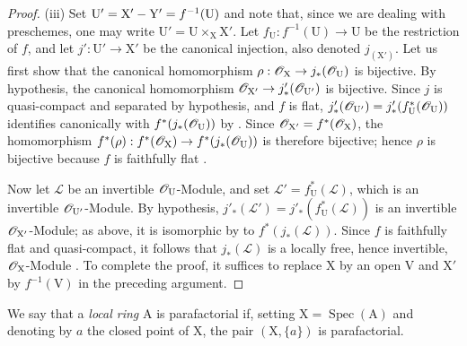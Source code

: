 \begin{proof}
(iii) Set $\mathrm{U}'=\mathrm{X}'-\mathrm{Y}'=f^{-1}(\mathrm{U})$ and note that, since we are dealing with preschemes, one may write $\mathrm{U}'=\mathrm{U}\times_{\mathrm{X}}\mathrm{X}'$. Let $f_{\mathrm{U}}:f^{-1}(\mathrm{U})\to\mathrm{U}$ be the restriction of $f$, and let $j':\mathrm{U}'\to\mathrm{X}'$ be the canonical injection, also denoted $j_{(\mathrm{X}')}$.
Let us first show that the canonical homomorphism $\rho:\mathscr{O}_{\mathrm{X}}\to j_*(\mathscr{O}_{\mathrm{U}})$ is bijective. By hypothesis, the canonical homomorphism $\mathscr{O}_{\mathrm{X}'}\to j'_*(\mathscr{O}_{\mathrm{U}'})$ is bijective. Since $j$ is quasi-compact and separated by hypothesis, and $f$ is flat, $j'_*(\mathscr{O}_{\mathrm{U}'})=j'_*(f_{\mathrm{U}}^*(\mathscr{O}_{\mathrm{U}}))$ identifies canonically with $f^*(j_*(\mathscr{O}_{\mathrm{U}}))$ by . Since $\mathscr{O}_{\mathrm{X}'}=f^*(\mathscr{O}_{\mathrm{X}})$, the homomorphism $f^*(\rho):f^*(\mathscr{O}_{\mathrm{X}})\to f^*(j_*(\mathscr{O}_{\mathrm{U}}))$ is therefore bijective; hence $\rho$ is bijective because $f$ is faithfully flat .

Now let $\mathscr{L}$ be an invertible $\mathscr{O}_{\mathrm{U}}$-Module, and set $\mathscr{L}'=f_{\mathrm{U}}^*(\mathscr{L})$, which is an invertible $\mathscr{O}_{\mathrm{U}'}$-Module. By hypothesis, $j'_*(\mathscr{L}')=j'_*(f_{\mathrm{U}}^*(\mathscr{L}))$ is an invertible $\mathscr{O}_{\mathrm{X}'}$-Module; as above, it is isomorphic by  to $f^*(j_*(\mathscr{L}))$. Since $f$ is faithfully flat and quasi-compact, it follows that $j_*(\mathscr{L})$ is a locally free, hence invertible, $\mathscr{O}_{\mathrm{X}}$-Module . To complete the proof, it suffices to replace $\mathrm{X}$ by an open $\mathrm{V}$ and $\mathrm{X}'$ by $f^{-1}(\mathrm{V})$ in the preceding argument.
\end{proof}

\begin{definition}[21.13.7]
\label{IV.21.13.7}
We say that a \emph{local ring} $\mathrm{A}$ is parafactorial if, setting $\mathrm{X}=\operatorname{Spec}(\mathrm{A})$ and denoting by $a$ the closed point of $\mathrm{X}$, the pair $(\mathrm{X},\{a\})$ is parafactorial.
\end{definition}

